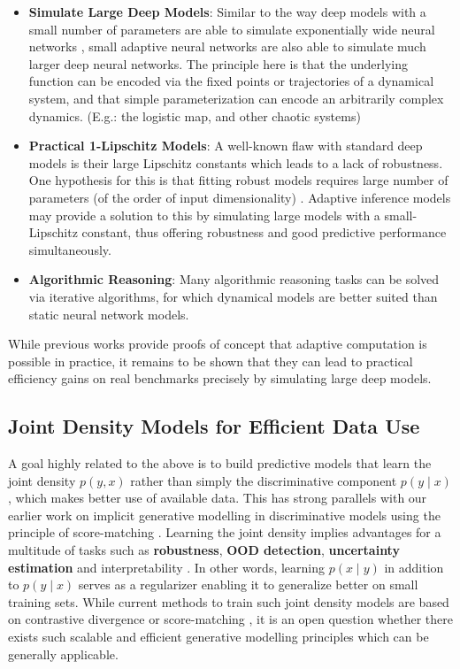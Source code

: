 \documentclass{article}
\renewcommand{\cite}{\citep}
\begin{document}
\begin{itemize}
    \item \textbf{Simulate Large Deep Models}: Similar to the way deep models with a small number of parameters are able to simulate exponentially wide neural networks \cite{poole2016exponential}, small adaptive neural networks are also able to simulate much larger deep neural networks. The principle here is that the underlying function can be encoded via the fixed points or trajectories of a dynamical system, and that simple parameterization can encode an arbitrarily complex dynamics. (E.g.: the logistic map, and other chaotic systems)
    \item \textbf{Practical 1-Lipschitz Models}: A well-known flaw with standard deep models is their large Lipschitz constants which leads to a lack of robustness. One hypothesis for this is that fitting robust models requires large number of parameters (of the order of input dimensionality) \cite{bubeck2021a}. Adaptive inference models may provide a solution to this by simulating large models with a small-Lipschitz constant, thus offering robustness and good predictive performance simultaneously.
    \item \textbf{Algorithmic Reasoning}: Many algorithmic reasoning tasks can be solved via iterative algorithms, for which dynamical models are better suited than static neural network models.
\end{itemize}

While previous works provide proofs of concept that adaptive computation is possible in practice, it remains to be shown that they can lead to practical efficiency gains on real benchmarks precisely by simulating large deep models. 

\subsection*{Joint Density Models for Efficient Data Use}
A goal highly related to the above is to build predictive models that learn the joint density $p(y, x)$ rather than simply the discriminative component $p(y \mid x)$, which makes better use of available data. This has strong parallels with our earlier work on implicit generative modelling in discriminative models \cite{srinivas2021rethinking} using the principle of score-matching \cite{hyvarinen2005estimation}. Learning the joint density implies advantages for a multitude of tasks such as \textbf{robustness}, \textbf{OOD detection}, \textbf{uncertainty estimation} and interpretability \cite{Grathwohl2020Your}. In other words, learning $p(x \mid y)$ in addition to $p(y \mid x)$ serves as a regularizer enabling it to generalize better on small training sets. While current methods to train such joint density models are based on contrastive divergence \cite{Grathwohl2020Your} or score-matching \cite{srinivas2021rethinking}, it is an open question whether there exists such scalable and efficient generative modelling principles which can be generally applicable.
\end{document}
